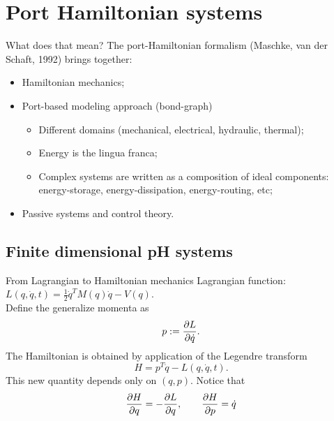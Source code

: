 \documentclass[aspectratio=169]{ISAE-Beamer}
\begin{document}
\section{Port Hamiltonian systems}

\begin{frame}{What does that mean?}
	The port-Hamiltonian formalism (Maschke, van der Schaft, 1992) brings together:
	\begin{itemize}
		\item Hamiltonian mechanics;
		\item Port-based modeling approach (bond-graph)
		\begin{itemize}
		\item Different domains (mechanical, electrical, hydraulic, thermal);
		\item Energy is the lingua franca;
		\item Complex systems are written as a composition of ideal components:
		energy-storage, energy-dissipation, energy-routing, etc; 
		\end{itemize}
	\item Passive systems and control theory.
	\end{itemize}
	
\end{frame}

\subsection{Finite dimensional pH systems}

\begin{frame}{From Lagrangian to Hamiltonian mechanics}
Lagrangian function: $L(q, \dot{q}, t) = \frac{1}{2} \dot{q}^T M(q) \dot{q} - V(q)$. \\
Define the generalize momenta as 
\[ p := \diffp{L}{\dot{q}}.
\]
The Hamiltonian is obtained by application of the Legendre transform
\[ H = p^T\dot{q} - L(q, \dot{q}, t).
\]
This new quantity depends only on $(q, p)$. Notice that 
\[
\diffp{H}{q} = -\diffp{L}{q}, \qquad \diffp{H}{p} = \dot{q} 
\]
\end{frame}
\end{document}
